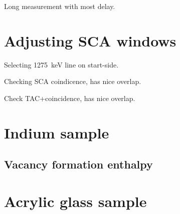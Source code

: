 \documentclass[11pt, english, fleqn, DIV=15, headinclude, BCOR=2cm]{scrreprt}
\begin{document}
Long measurement with most delay.

\section{Adjusting SCA windows}

Selecting \SI{1275}{\kilo\electronvolt} line on start-side.

Checking SCA coindicence, has nice overlap.

Check TAC+coincidence, has nice overlap.

\section{Indium sample}

\subsection{Vacancy formation enthalpy}

\section{Acrylic glass sample}
\end{document}
